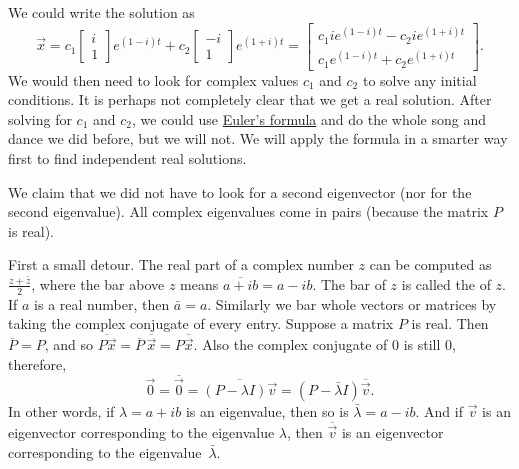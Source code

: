 We could write the solution as
\begin{equation*}
\vec{x} =
c_1 \begin{bmatrix} i \\ 1 \end{bmatrix} e^{(1-i)t} +
c_2 \begin{bmatrix} -i \\ 1 \end{bmatrix} e^{(1+i)t}
=
\begin{bmatrix}
c_1 i e^{(1-i)t} - c_2 i e^{(1+i)t} \\
c_1 e^{(1-i)t} + c_2 e^{(1+i)t}
\end{bmatrix} .
\end{equation*}
We would then need to look for complex values $c_1$ and $c_2$ to solve
any initial conditions.  It is perhaps not completely clear
that we get a real solution.  After solving for $c_1$ and $c_2$,
we could use
\hyperref[eulersformula]{Euler's formula} and do the
whole song and dance we did before, but we will not.   We will apply
the formula in a smarter way first to find independent real solutions.

\medskip

We claim that we did not have to look for a second eigenvector
(nor for the second eigenvalue).  All complex eigenvalues come in pairs
(because the matrix $P$ is real).

First a small detour.  The real part of
a complex number $z$ can be computed as $\frac{z + \bar{z}}{2}$, where
the bar above $z$ means $\overline{a+ib} = a -ib$.  The bar of $z$ is called the
\emph{} of $z$.
If $a$ is a real number, then $\bar{a} = a$.
Similarly
we bar whole vectors or matrices by taking the complex conjugate
of every entry.  Suppose a matrix $P$ is real.  Then
$\overline{P} = P$, and so $\overline{P\vec{x}} = \overline{P} \,
\overline{\vec{x}} = P \overline{\vec{x}}$.
Also the complex conjugate of 0 is still 0,
therefore,
\begin{equation*}
\vec{0} = \overline{\vec{0}} = 
\overline{(P-\lambda I)\vec{v}}
=
(P-\bar{\lambda} I)\overline{\vec{v}} .
\end{equation*}
In other words, if $\lambda = a+ib$ is an eigenvalue, then so is $\bar{\lambda} = a-ib$.
And if $\vec{v}$ is an eigenvector corresponding to the eigenvalue
$\lambda$, then $\overline{\vec{v}}$ is an eigenvector corresponding
to the eigenvalue~$\bar{\lambda}$.  

